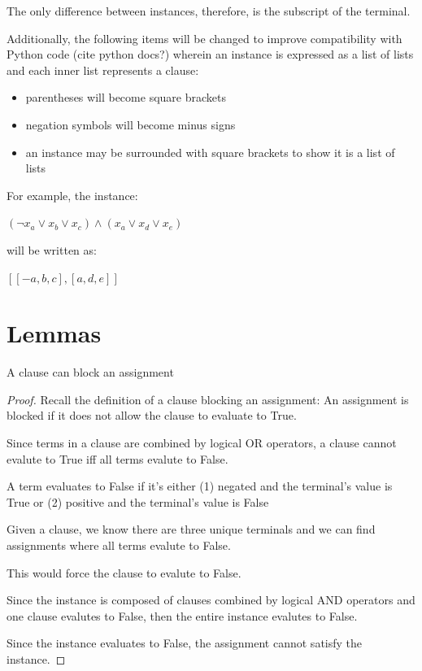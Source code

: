\documentclass[manuscript]{acmart}
\begin{document}
    The only difference between instances, therefore, is the subscript of the terminal.
    
    Additionally, the following items will be changed to improve compatibility
    with Python code (cite python docs?) wherein an instance is expressed as
    a list of lists and each inner list represents a clause:
    \begin{itemize}
        \item parentheses will become square brackets
        \item negation symbols will become minus signs
        \item an instance may be surrounded with square brackets to show it is a list of lists
    \end{itemize}
   
    For example, the instance:
    
    $(\neg x_a \lor x_b \lor x_c) \land (x_a \lor x_d \lor x_e)$

    will be written as:

    $[[-a, b, c], [a, d, e]]$


    \section{Lemmas}

    \begin{lemma}
        A clause can block an assignment    
    \end{lemma}
    \begin{proof}
        Recall the definition of a clause blocking an assignment:
        An assignment is blocked if it does not allow the clause to evaluate to True.

        Since terms in a clause are combined by logical OR operators, a 
        clause cannot evalute to True iff all terms evalute to False.

        A term evaluates to False if it's either (1) negated and the terminal's
        value is True or (2) positive and the terminal's value is False

        Given a clause, we know there are three unique terminals and we can
        find assignments where all terms evalute to False.

        This would force the clause to evalute to False.

        Since the instance is composed of clauses combined by logical AND operators 
        and one clause evalutes to False, then the entire instance evalutes to False.

        Since the instance evaluates to False, the assignment cannot satisfy
        the instance.
    \end{proof}
\end{document}
